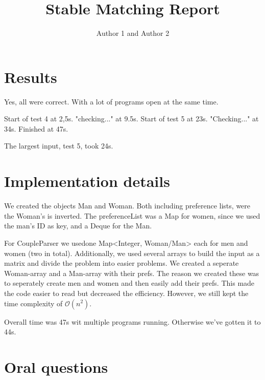 \documentclass{article}
\title{Stable Matching Report}
\author{Author 1 and Author 2}
\begin{document}
  \maketitle

  \section{Results}

  
  Yes, all were correct. With a lot of programs open at the same time.
  
  Start of test 4 at 2,5s.
  "checking..." at 9.5s.
  Start of test 5 at 23s.
  "Checking..." at 34s.
  Finished at 47s.
  
  The largest input, test 5, took 24s.
  
  
  

  \section{Implementation details}

  
  We created the objects Man and Woman. Both including preference lists, were the Woman's is inverted. The preferenceList was a Map for women, since we used the man's ID as key, and a Deque for the Man.
  
  For CoupleParser we usedone Map<Integer, Woman/Man> each for men and women (two in total). Additionally, we used several arrays to build the input as a matrix and divide the problem into easier problems. We created a seperate Woman-array and a Man-array with their prefs. The reason we created these was to seperately create men and women and then easily add their prefs. This made the code easier to read but decreased the efficiency. However, we still kept the time complexity of $\mathcal{O}(n^{2})$.
  
  Overall time was 47s wit multiple programs running. Otherwise we've gotten it to 44s.
  
  \section{Oral questions}
  
\end{document}
